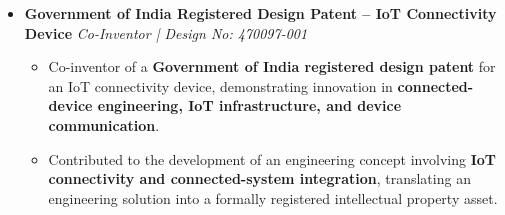 \documentclass[a4paper,11pt]{article}
\newcommand{\resumeItem}[1]{
    \item \small{#1 \vspace{-2pt}}
}
\begin{document}
\begin{itemize}[leftmargin=0in, label={}]

\item
\textbf{Government of India Registered Design Patent -- IoT Connectivity Device}
\hfill \textit{Co-Inventor | Design No: 470097-001}

\begin{itemize}[leftmargin=*]

\resumeItem{Co-inventor of a \textbf{Government of India registered design patent} for an IoT connectivity device, demonstrating innovation in \textbf{connected-device engineering, IoT infrastructure, and device communication}.}

\resumeItem{Contributed to the development of an engineering concept involving \textbf{IoT connectivity and connected-system integration}, translating an engineering solution into a formally registered intellectual property asset.}

\end{itemize}

\end{itemize}

\vspace{-10pt}
\end{document}

